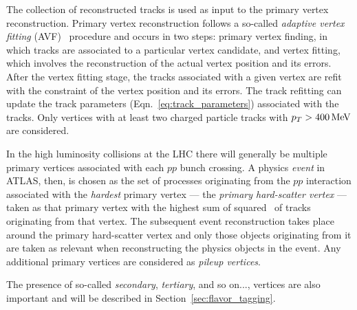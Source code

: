 The collection of reconstructed tracks is used as input to the primary vertex reconstruction.
Primary vertex reconstruction follows a so-called \textit{adaptive vertex fitting} (AVF)~\cite{Aaboud:2016rmg,Piacquadio_2008}
procedure and occurs in two steps: primary vertex finding,
in which tracks are associated to a particular vertex candidate, and vertex fitting,
which involves the reconstruction of the actual vertex position and its errors.
After the vertex fitting stage, the tracks associated with a given vertex are refit
with the constraint of the vertex position and its errors. The track refitting can update
the track parameters (Eqn.~\ref{eq:track_parameters}) associated with the tracks.
Only vertices with at least two charged particle tracks with $p_{T} > 400\,\text{Me\kern -0.1em V}$ are
considered.

In the high luminosity collisions at the LHC there will generally be multiple primary vertices
associated with each $pp$ bunch crossing.
A physics \textit{event} in ATLAS, then, is chosen as the set of processes originating from the $pp$ interaction
associated with the \textit{hardest} primary vertex --- the \textit{primary hard-scatter vertex} --- taken as that primary vertex with the
highest sum of squared \pT~of tracks originating from that vertex.
The subsequent event reconstruction takes place around the primary hard-scatter vertex and only
those objects originating from it are taken as relevant when reconstructing the physics objects in the event.
Any additional primary vertices are considered as \textit{pileup vertices}.

The presence of so-called \textit{secondary}, \textit{tertiary}, and so on..., vertices are also
important and will be described in Section~\ref{sec:flavor_tagging}.

